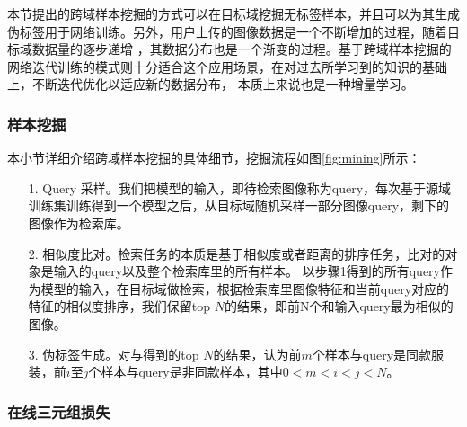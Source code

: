 本节提出的跨域样本挖掘的方式可以在目标域挖掘无标签样本，并且可以为其生成伪标签用于网络训练。另外，用户上传的图像数据是一个不断增加的过程，随着目标域数据量的逐步递增
，其数据分布也是一个渐变的过程。基于跨域样本挖掘的网络迭代训练的模式则十分适合这个应用场景，在对过去所学习到的知识的基础上，不断迭代优化以适应新的数据分布，
本质上来说也是一种增量学习。
\subsubsection{样本挖掘}

本小节详细介绍跨域样本挖掘的具体细节，挖掘流程如图\ref{fig:mining}所示：
\begin{itemize}
  \item[1.]Query 采样。我们把模型的输入，即待检索图像称为query，每次基于源域训练集训练得到一个模型之后，从目标域随机采样一部分图像query，剩下的图像作为检索库。
  \item[2.]相似度比对。检索任务的本质是基于相似度或者距离的排序任务，比对的对象是输入的query以及整个检索库里的所有样本。
  以步骤1得到的所有query作为模型的输入，在目标域做检索，根据检索库里图像特征和当前query对应的特征的相似度排序，我们保留top $N$的结果，即前N个和输入query最为相似的图像。
  \item[3.]伪标签生成。对与得到的top $N$的结果，认为前$m$个样本与query是同款服装，前$i$至$j$个样本与query是非同款样本，其中$0<m<i<j<N$。
\end{itemize}
\subsubsection{在线三元组损失}

